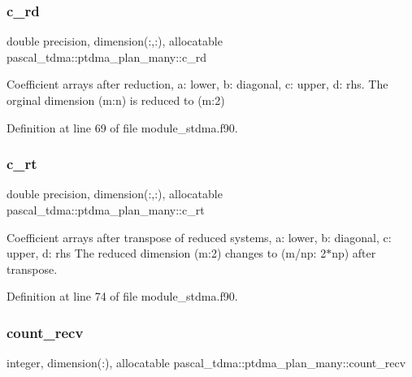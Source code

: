 \subsubsection{\texorpdfstring{c\_rd}{c\_rd}}
{\footnotesize\ttfamily double precision, dimension(\+:,\+:), allocatable pascal\+\_\+tdma\+::ptdma\+\_\+plan\+\_\+many\+::c\+\_\+rd}



Coefficient arrays after reduction, a\+: lower, b\+: diagonal, c\+: upper, d\+: rhs. The orginal dimension (m\+:n) is reduced to (m\+:2) 



Definition at line 69 of file module\+\_\+stdma.\+f90.

\mbox{\label{structpascal__tdma_1_1ptdma__plan__many_a49336d53d19c274798e87ae33b530b33}} 
\subsubsection{\texorpdfstring{c\_rt}{c\_rt}}
{\footnotesize\ttfamily double precision, dimension(\+:,\+:), allocatable pascal\+\_\+tdma\+::ptdma\+\_\+plan\+\_\+many\+::c\+\_\+rt}



Coefficient arrays after transpose of reduced systems, a\+: lower, b\+: diagonal, c\+: upper, d\+: rhs The reduced dimension (m\+:2) changes to (m/np\+: 2$\ast$np) after transpose. 



Definition at line 74 of file module\+\_\+stdma.\+f90.

\mbox{\label{structpascal__tdma_1_1ptdma__plan__many_a30cebfb14bfcc955d3e98d9b1ea5fad7}} 
\subsubsection{\texorpdfstring{count\_recv}{count\_recv}}
{\footnotesize\ttfamily integer, dimension(\+:), allocatable pascal\+\_\+tdma\+::ptdma\+\_\+plan\+\_\+many\+::count\+\_\+recv}




